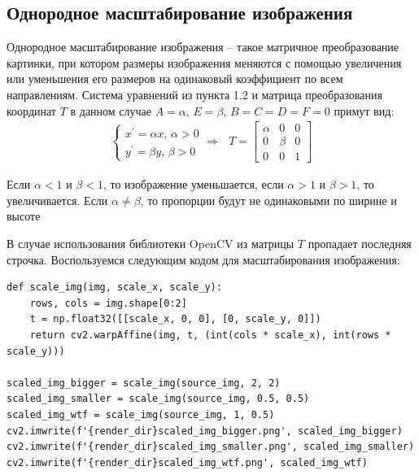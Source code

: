 \documentclass[a4paper, 16pt]{article}
\begin{document}
\subsection{Однородное масштабирование изображения}
\noindent Однородное масштабирование изображения -- такое матричное преобразование картинки,
при котором размеры изображения меняются с помощью увеличения или уменьшения его размеров
на одинаковый коэффициент по всем направлениям. Система уравнений из пункта 1.2 и матрица 
преобразования координат $T$ в данном случае $A=\alpha,\,E=\beta,\,B=C=D=F=0$ примут вид:
\begin{align*}
    \begin{cases}
        x^{\prime}=\alpha x,\,\alpha>0\\
        y^{\prime}=\beta y,\,\beta>0
    \end{cases}\Rightarrow\,\,\,\,
    T=
    \begin{bmatrix}
        \alpha &0 &0\\
        0 &\beta &0\\
        0 &0 &1
    \end{bmatrix}
\end{align*}


\noindent Если $\alpha<1 \text{ и } \beta<1$, то изображение уменьшается, если 
$\alpha>1 \text{ и } \beta>1$, то увеличивается. Если $\alpha\neq\beta$, то пропорции
будут не одинаковыми по ширине и высоте


\noindent В случае использования библиотеки OpenCV из матрицы $T$ пропадает последняя строчка.
Воспользуемся следующим кодом для масштабирования изображения:
\begin{lstlisting}[label=scale-code,caption=Код для масштабирования изображения]
def scale_img(img, scale_x, scale_y):
    rows, cols = img.shape[0:2]
    t = np.float32([[scale_x, 0, 0], [0, scale_y, 0]])
    return cv2.warpAffine(img, t, (int(cols * scale_x), int(rows * scale_y)))

scaled_img_bigger = scale_img(source_img, 2, 2)
scaled_img_smaller = scale_img(source_img, 0.5, 0.5)
scaled_img_wtf = scale_img(source_img, 1, 0.5)
cv2.imwrite(f'{render_dir}scaled_img_bigger.png', scaled_img_bigger)
cv2.imwrite(f'{render_dir}scaled_img_smaller.png', scaled_img_smaller)
cv2.imwrite(f'{render_dir}scaled_img_wtf.png', scaled_img_wtf)
\end{lstlisting}
\end{document}
